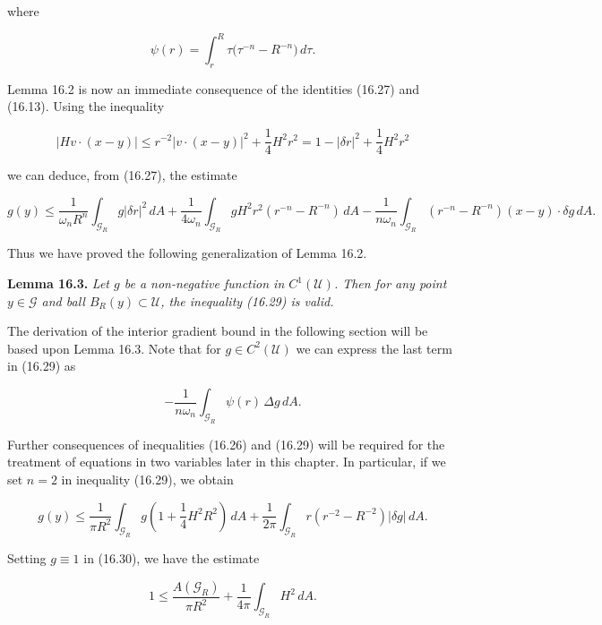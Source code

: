 where

\[
\psi(r)=\int_r^R \tau\bigl(\tau^{-n}-R^{-n}\bigr)\,d\tau.
\]

Lemma 16.2 is now an immediate consequence of the identities (16.27) and (16.13).
Using the inequality

\begin{equation}
|Hv\cdot (x-y)|\le r^{-2}|v\cdot (x-y)|^2+\frac14 H^2r^2
=1-|\delta r|^2+\frac14 H^2r^2
\tag{16.28}
\end{equation}

we can deduce, from (16.27), the estimate

\begin{equation}
g(y)\le \frac{1}{\omega_n R^n}\int_{\mathcal{G}_R} g|\delta r|^2\,dA
+\frac{1}{4\omega_n}\int_{\mathcal{G}_R} gH^2r^2(r^{-n}-R^{-n})\,dA
-\frac{1}{n\omega_n}\int_{\mathcal{G}_R}(r^{-n}-R^{-n})(x-y)\cdot \delta g\,dA.
\tag{16.29}
\end{equation}

Thus we have proved the following generalization of Lemma 16.2.

\textbf{Lemma 16.3.} \textit{Let $g$ be a non-negative function in $C^1(\mathcal{U})$. Then for any point $y\in \mathcal{G}$
and ball $B_R(y)\subset \mathcal{U}$, the inequality (16.29) is valid.}

The derivation of the interior gradient bound in the following section will be
based upon Lemma 16.3. Note that for $g\in C^2(\mathcal{U})$ we can express the last term in
(16.29) as

\[
-\frac{1}{n\omega_n}\int_{\mathcal{G}_R}\psi(r)\,\Delta g\,dA.
\]

Further consequences of inequalities (16.26) and (16.29) will be required for the
treatment of equations in two variables later in this chapter. In particular, if we set
$n=2$ in inequality (16.29), we obtain

\begin{equation}
g(y)\le \frac{1}{\pi R^2}\int_{\mathcal{G}_R} g\left(1+\frac14 H^2R^2\right)\,dA
+\frac{1}{2\pi}\int_{\mathcal{G}_R} r(r^{-2}-R^{-2})|\delta g|\,dA.
\tag{16.30}
\end{equation}

Setting $g\equiv 1$ in (16.30), we have the estimate

\begin{equation}
1\le \frac{A(\mathcal{G}_R)}{\pi R^2}+\frac{1}{4\pi}\int_{\mathcal{G}_R} H^2\,dA.
\tag{16.31}
\end{equation}

